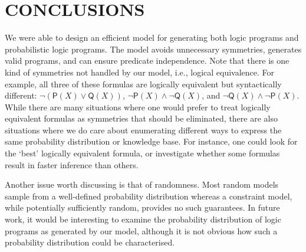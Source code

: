\documentclass[letterpaper]{article}
\theoremstyle{definition}
\newcommand{\maxNumNodes}{\mathcal{M}_{\mathcal{N}}}
\begin{document}

\section{CONCLUSIONS}

We were able to design an efficient model for generating both logic programs and
probabilistic logic programs. The model avoids unnecessary symmetries, generates
valid programs, and can ensure predicate independence. Note that there is one
kind of symmetries not handled by our model, i.e., logical equivalence. For
example, all three of these formulas are logically equivalent but syntactically
different: $\neg(\mathsf{P}(X) \lor \mathsf{Q}(X))$, $\neg\mathsf{P}(X) \land
\neg\mathsf{Q}(X)$, and $\neg\mathsf{Q}(X) \land \neg\mathsf{P}(X)$. While there
are many situations where one would prefer to treat logically equivalent
formulas as symmetries that should be eliminated, there are also situations
where we do care about enumerating different ways to express the same
probability distribution or knowledge base. For instance, one could look for the
`best' logically equivalent formula, or investigate whether some formulas result
in faster inference than others.

Another issue worth discussing is that of randomness. Most random models sample
from a well-defined probability distribution whereas a constraint model, while
potentially sufficiently random, provides no such guarantees. In future work, it
would be interesting to examine the probability distribution of logic programs
as generated by our model, although it is not obvious how such a
probability distribution could be characterised.
\end{document}

